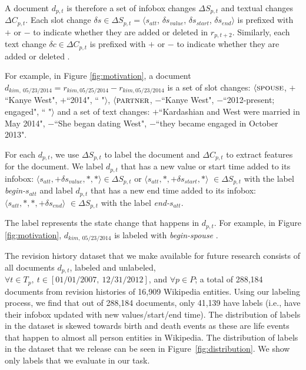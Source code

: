 A document $d_{p, t}$ is therefore %
a set of infobox changes $\Delta S_{p, t}$ and textual changes $\Delta C_{p, t}$. Each slot change $\delta s \in \Delta S_{p, t} = \langle s_{att}$, $\delta s_{value}$,  $\delta s_{start}$, $\delta s_{end} \rangle$ %
is prefixed with $+$ or $-$ to indicate whether they are added or deleted in $r_{p, t+2}$. Similarly, each text change $\delta c \in \Delta C_{p, t}$ is prefixed with $+$ or $-$ to indicate whether they are added or deleted%
. 

For example, in Figure \ref{fig:motivation}, a document $d_{kim,\ 05/23/2014} = r_{kim, 05/25/2014} - r_{kim, 05/23/2014}$ is a set of slot changes: $\langle\textsc{spouse}$, \textbf{$+$}\footnotesize ``Kanye West"\normalsize,  $+$\footnotesize ``2014"\normalsize, \footnotesize`` "\normalsize$\rangle$, $\langle\textsc{partner}$, $-$\footnotesize``Kanye West"\normalsize,  $-$\footnotesize``2012-present; engaged"\normalsize, \footnotesize`` "\normalsize$\rangle$ and a set of text changes: $+$\footnotesize``Kardashian and West were married in May 2014"\normalsize, $-$\footnotesize``She began dating West"\normalsize, $-$\footnotesize``they became engaged in October 2013"\normalsize.

For each $d_{p, t}$, we use $\Delta S_{p, t}$ to label the document and $\Delta C_{p, t}$ to extract features for the document. We label $d_{p, t}$ that has a new value or start time added to its infobox: $\langle s_{att}, +\delta s_{value}, *, *\rangle \in \Delta S_{p, t}$ or $\langle s_{att}, *, +\delta s_{start}, *\rangle$ $\in \Delta S_{p, t}$ with the label \textit{begin-}$s_{att}$ and label $d_{p, t}$ that has a new end time added to its infobox: $\langle s_{att}, *, *, +\delta s_{end}\rangle$ $\in \Delta S_{p, t}$ with the label \textit{end-}$s_{att}$. 

The label represents the state change that happens in $d_{p, t}$. For example, in Figure \ref{fig:motivation}, $d_{kim,\ 05/23/2014}$ is labeled with \textit{begin-spouse}%
. 

The revision history dataset that we make available for future research consists of all documents $d_{p, t}$, labeled and unlabeled, $\forall t \in T_p,\ t \in [01/01/2007,\ 12/31/2012]$, and $\forall p \in P$; a total of 288,184 documents from revision histories of 16,909 Wikipedia entities. Using our labeling process, we find that out of 288,184 documents, only 41,139 have labels (i.e., have their infobox updated with new values/start/end time). The distribution of labels in the dataset is skewed towards birth and death events as these are life events that happen to almost all person entities in Wikipedia. The distribution of labels in the dataset that we release can be seen in Figure~\ref{fig:distribution}. We show only labels that we evaluate in our task. 

